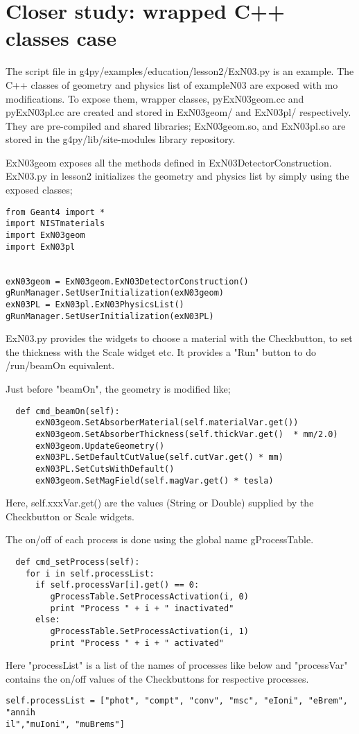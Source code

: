 \documentclass{article}
\begin{document}
  
\section{Closer study: wrapped C++ classes case}

 The script file in g4py/examples/education/lesson2/ExN03.py is an example.
The C++ classes of geometry and physics list of exampleN03 are exposed with
mo modifications. To expose them,  wrapper classes, pyExN03geom.cc and 
pyExN03pl.cc are created and stored in ExN03geom/ and ExN03pl/  respectively. 
They are pre-compiled and shared libraries; ExN03geom.so, and ExN03pl.so are
stored in the g4py/lib/site-modules library repository.


 ExN03geom exposes all the methods defined in ExN03DetectorConstruction.
ExN03.py in lesson2 initializes the geometry and physics list by simply using 
the exposed classes;
\begin{verbatim}
from Geant4 import *
import NISTmaterials
import ExN03geom
import ExN03pl


exN03geom = ExN03geom.ExN03DetectorConstruction()
gRunManager.SetUserInitialization(exN03geom)
exN03PL = ExN03pl.ExN03PhysicsList()
gRunManager.SetUserInitialization(exN03PL)
\end{verbatim}

ExN03.py provides the widgets to choose a material with the Checkbutton,
to set the thickness with the Scale widget etc. It provides a "Run" button
to do /run/beamOn equivalent.

Just before "beamOn", the geometry is modified like; 
\begin{verbatim}
  def cmd_beamOn(self):
      exN03geom.SetAbsorberMaterial(self.materialVar.get())
      exN03geom.SetAbsorberThickness(self.thickVar.get()  * mm/2.0)
      exN03geom.UpdateGeometry()
      exN03PL.SetDefaultCutValue(self.cutVar.get() * mm)
      exN03PL.SetCutsWithDefault()
      exN03geom.SetMagField(self.magVar.get() * tesla)
\end{verbatim}
Here, self.xxxVar.get() are the values (String or Double) supplied by the
Checkbutton or Scale widgets.

The on/off of each process is done using the global name gProcessTable.
\begin{verbatim}
  def cmd_setProcess(self):
    for i in self.processList:
      if self.processVar[i].get() == 0:
         gProcessTable.SetProcessActivation(i, 0)
         print "Process " + i + " inactivated"
      else:
         gProcessTable.SetProcessActivation(i, 1)
         print "Process " + i + " activated"
\end{verbatim}
Here "processList" is a list of the names of processes like below and 
"processVar" contains the on/off values of the Checkbuttons for respective 
processes.
\begin{verbatim}
self.processList = ["phot", "compt", "conv", "msc", "eIoni", "eBrem", "annih
il","muIoni", "muBrems"]
\end{verbatim}
\end{document}
